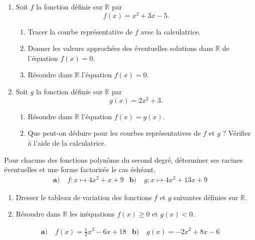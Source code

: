 \documentclass[11pt]{article}
\begin{document}
\begin{exo}
  \begin{enumerate}
    \item Soit $f$ la fonction définie sur $\mathbb{R}$ par
      \[
        f(x) = x^2+3x-5.
      \]
      \begin{enumerate}
        \item Tracer la courbe représentative de $f$ avec la calculatrice.
        \item Donner les valeurs approchées des éventuelles solutions dans
          $\mathbb{R}$ de l'équation $f(x)=0$.
        \item Résoudre dans $\mathbb{R}$ l'équation $f(x)=0$.
      \end{enumerate}
    \item Soit $g$ la fonction définie sur $\mathbb{R}$ par
      \[
        g(x) = 2x^2+3.
      \]
      \begin{enumerate}
        \item Résoudre dans $\mathbb{R}$ l'équation $f(x)=g(x)$.
        \item Que peut-on déduire pour les courbes représentatives de $f$ et $g$
          ? Vérifier à l'aide de la calculatrice.
      \end{enumerate}
  \end{enumerate}
\end{exo}

\begin{exo}
  Pour chacune des fonctions polynôme du second degré, déterminer ses racines
  éventuelles et une forme factorisée le cas échéant.
  \begin{align*}
    \textbf{a)}&\; f:x\mapsto 4x^2+x+9 &
    \textbf{b)}&\; g:x\mapsto 4x^2+13x+9
  \end{align*}
\end{exo}

\begin{exo}
  \begin{enumerate}
    \item Dresser le tableau de variation des fonctions $f$ et $g$ suivantes définies
  sur $\mathbb{R}$.
\item Résoudre dans $\mathbb{R}$ les inéquations $f(x)\geq0$ et $g(x)<0$.
  \end{enumerate}
  \begin{align*}
    \textbf{a)}&\; f(x) = \frac{1}{2}x^2-6x+18 &
    \textbf{b)}&\; g(x) = -2x^2+8x-6
  \end{align*}
\end{exo}
\end{document}
